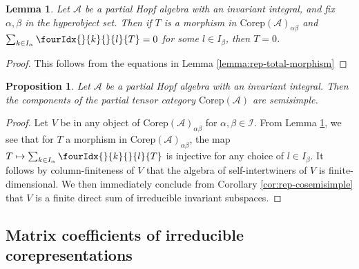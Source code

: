 \documentclass[10pt]{article}
\DeclareMathOperator{\rcf}{\mathrm{rcfd}}
\newcommand{\Corep}{\mathrm{Corep}}
\newcommand{\Gr}[5]{\fourIdx{#2}{#4}{#3}{#5}{#1}}%
\newcommand{\Gru}[3]{\Gr{#1}{}{}{#2}{#3}}
\newtheorem{Lem}[Theorem]{Lemma}
\newtheorem{Prop}[Theorem]{Proposition}
\theoremstyle{definition}
\numberwithin{equation}{section}
\begin{document}


\begin{Lem}\label{LemInjMor}  Let $\mathscr{A}$ be a partial Hopf algebra with an invariant integral, and fix $\alpha,\beta$ in the hyperobject set.  Then if $T$ is a morphism in $\Corep(\mathscr{A})_{\alpha\beta}$ and $\sum_{k\in I_\alpha} \Gru{T}{k}{l}=0$ for some $l \in I_\beta$, then $T=0$.
\end{Lem} 

\begin{proof} This follows from the equations in Lemma \ref{lemma:rep-total-morphism}
\end{proof}

\begin{Prop}\label{prop:rep-cosemisimple} Let $\mathscr{A}$ be a partial Hopf algebra with an invariant integral.   Then the components of the partial tensor category $\Corep(\mathscr{A})$ are semisimple.
\end{Prop}
\begin{proof} 
Let $V$ be in any object of $\Corep(\mathscr{A})_{\alpha\beta}$ for $\alpha,\beta\in \mathscr{I}$.  From Lemma \ref{LemInjMor}, we see that for $T$ a morphism in $\Corep(\mathscr{A})_{\alpha\beta}$, the map $T\mapsto \sum_{k\in I_\alpha} \Gru{T}{k}{l}$ is injective for any choice of $l\in I_\beta$. It follows by column-finiteness of $V$ that the algebra of self-intertwiners of $V$ is finite-dimensional. We then immediately conclude from Corollary \ref{cor:rep-cosemisimple}  that $V$ is a finite direct sum of irreducible invariant subspaces.
\end{proof} 

\subsection{Matrix coefficients of irreducible corepresentations}
\end{document}
